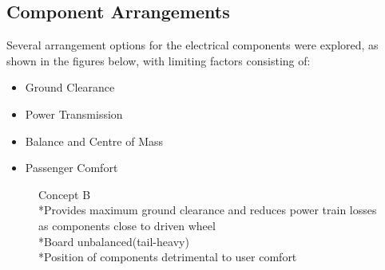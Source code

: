 \documentclass[journal,10pt]{IEEEtran}
\begin{document}
    \subsection{Component Arrangements}
        Several arrangement options for the electrical components were explored, as shown in the figures below, with limiting factors consisting of:
        \begin{itemize}
            	\item Ground Clearance
            	\item Power Transmission
            	\item Balance and Centre of Mass
            	\item Passenger Comfort
            \end{itemize}
        \begin{figure}[H]
                \centering
                \caption{Concept B
                \\*Provides maximum ground clearance and reduces power train losses as components close to driven wheel
                \\*Board unbalanced(tail-heavy)
                \\*Position of components detrimental to user comfort}
                \label{fig:ConceptB}
            \end{figure}  
\end{document}
